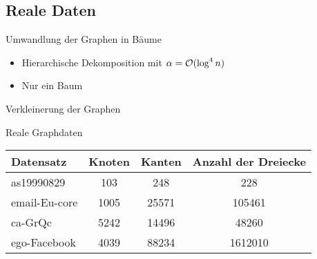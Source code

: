 \subsection{Reale Daten}

\begin{frame}{Umwandlung der Graphen in Bäume}
    \begin{itemize}[<+(1)->]
        \item Hierarchische Dekomposition mit $\alpha=\mathcal{O}(\log^4 n)$
        \item Nur ein Baum
    \end{itemize}
\end{frame}

\begin{frame}{Verkleinerung der Graphen}
\end{frame}

\begin{frame}{Reale Graphdaten}
    \begin{table}
        \centering
        \begin{tabular}{lccc}
            \toprule
            Datensatz & Knoten & Kanten & Anzahl der Dreiecke \\
            \midrule
            as19990829 & 103 & 248 & 228 \\
            email-Eu-core & 1005 & 25571 & 105461 \\
            ca-GrQc & 5242 & 14496 & 48260 \\
            ego-Facebook & 4039 & 88234 & 1612010 \\
            \bottomrule
        \end{tabular}
    \end{table}
\end{frame}

